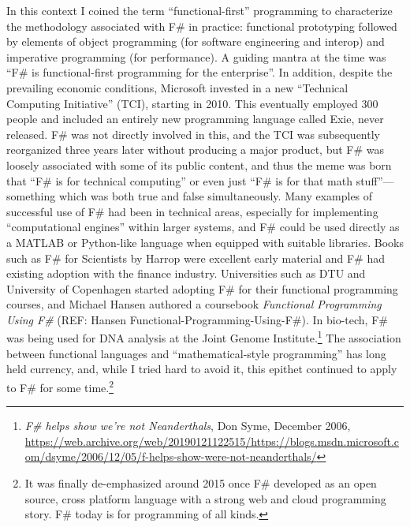 \documentclass[acmsmall]{acmart}\settopmatter{}
\begin{document}
In this context I coined the term “functional-first” programming to characterize the methodology associated with F\# in practice: functional prototyping
followed by elements of object programming (for software engineering and interop) and imperative programming (for performance). A guiding mantra
at the time was “F\# is functional-first programming for the enterprise”.  In addition, despite the prevailing economic conditions, Microsoft invested in a
new “Technical Computing Initiative” (TCI), starting in 2010. This eventually employed 300 people and included an entirely new programming language
called Exie, never released.  F\# was not directly involved in this, and the TCI was subsequently reorganized three years later without producing a major
product, but F\# was loosely associated with some of its public content, and thus the meme was born that “F\# is for technical computing” or even
just “F\# is for that math stuff”---something which was both true and false simultaneously. Many examples of successful use of F\# had been in
technical areas, especially for implementing “computational engines” within larger systems, and F\# could be used directly as a MATLAB or Python-like
language when equipped with suitable libraries.  Books such as F\# for Scientists by Harrop were excellent early material and F\# had existing adoption
with the finance industry. Universities such as DTU and University of Copenhagen started adopting F\# for their functional programming courses,
and Michael Hansen authored a coursebook \textit{Functional Programming Using F\#} (REF: Hansen Functional-Programming-Using-F\#).
In bio-tech, F\# was being used for DNA analysis at the Joint Genome
Institute.\footnote{\textit{F\# helps show we’re not Neanderthals}, Don Syme, December 2006, \url{https://web.archive.org/web/20190121122515/https://blogs.msdn.microsoft.com/dsyme/2006/12/05/f-helps-show-were-not-neanderthals/}}  The association between functional languages and
“mathematical-style programming” has long held currency, and, while I tried hard to avoid it, this epithet continued to
apply to F\# for some time.\footnote{It was finally de-emphasized around 2015 once F\# developed as an open source, cross
platform language with a strong web and cloud programming story. F\# today is for programming of all kinds.}

\label{page:fsharp-succinct}
\end{document}
